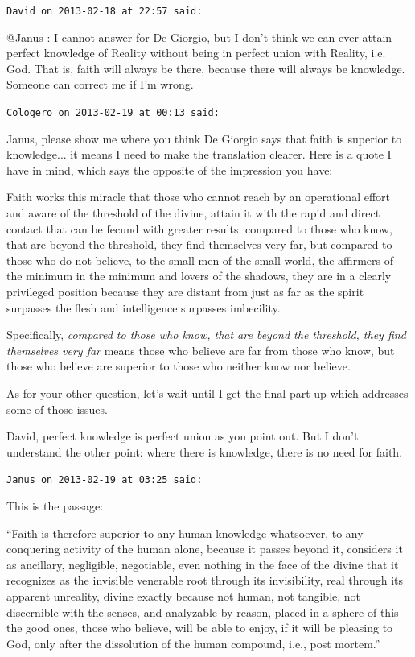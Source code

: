 \begin{footnotesize}
\begin{sffamily}
\hfill

\texttt{David on 2013-02-18 at 22:57 said:}

@Janus : I cannot answer for De Giorgio, but I don't think we can ever attain perfect knowledge of Reality without being in perfect union with Reality, i.e. God. That is, faith will always be there, because there will always be knowledge. Someone can correct me if I'm wrong.

\hfill

\texttt{Cologero on 2013-02-19 at 00:13 said:}

Janus, please show me where you think De Giorgio says that faith is superior to knowledge... it means I need to make the translation clearer. Here is a quote I have in mind, which says the opposite of the impression you have:

\begin{quotex}

Faith works this miracle that those who cannot reach by an operational effort and aware of the threshold of the divine, attain it with the rapid and direct contact that can be fecund with greater results: compared to those who know, that are beyond the threshold, they find themselves very far, but compared to those who do not believe, to the small men of the small world, the affirmers of the minimum in the minimum and lovers of the shadows, they are in a clearly privileged position because they are distant from just as far as the spirit surpasses the flesh and intelligence surpasses imbecility.
\end{quotex}


Specifically, \emph{compared to those who know, that are beyond the threshold, they find themselves very far} means those who believe are far from those who know, but those who believe are superior to those who neither know nor believe.

As for your other question, let's wait until I get the final part up which addresses some of those issues.

David, perfect knowledge is perfect union as you point out. But I don't understand the other point: where there is knowledge, there is no need for faith.

\hfill

\texttt{Janus on 2013-02-19 at 03:25 said:}

This is the passage:

``Faith is therefore superior to any human knowledge whatsoever, to any conquering activity of the human alone, because it passes beyond it, considers it as ancillary, negligible, negotiable, even nothing in the face of the divine that it recognizes as the invisible venerable root through its invisibility, real through its apparent unreality, divine exactly because not human, not tangible, not discernible with the senses, and analyzable by reason, placed in a sphere of this the good ones, those who believe, will be able to enjoy, if it will be pleasing to God, only after the dissolution of the human compound, i.e., post mortem.''


\end{sffamily}
\end{footnotesize}
